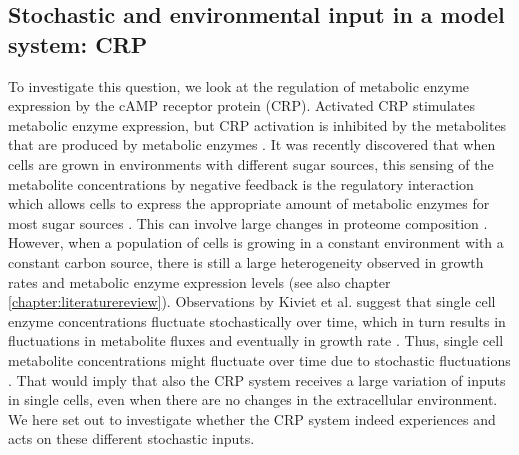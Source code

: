 
\subsection{Stochastic and environmental input in a model system: CRP}

To investigate this question, we look at the regulation of metabolic enzyme expression by the cAMP receptor protein (CRP).
%
Activated CRP stimulates metabolic enzyme expression, but CRP activation is inhibited by the metabolites that are produced by metabolic enzymes \cite{You2013}.
%
It was recently discovered that when cells are grown in environments with different sugar sources, 
this sensing of the metabolite concentrations by negative feedback 
is the regulatory interaction which %
allows cells to 
express the appropriate amount of metabolic enzymes for most sugar sources \cite{Towbin2017}.
%
This can involve large changes in proteome composition \cite{You2013, Hui2015}.
%
However, when a population of cells is growing in a constant environment with a constant carbon source,
there is still a large heterogeneity observed in growth rates and metabolic enzyme expression levels \cite{Kiviet2014} (see also chapter \ref{chapter:literaturereview}).
%
Observations by Kiviet et al. suggest that single cell enzyme concentrations fluctuate stochastically over time, which in turn results in fluctuations in metabolite fluxes and eventually in growth rate \cite{Kiviet2014}.
%
Thus, single cell metabolite concentrations might fluctuate over time due to stochastic fluctuations .
That would imply that also the CRP system receives a large variation of inputs in single cells, even when there are no changes in the extracellular environment.
%
%
We here set out to investigate whether the CRP system indeed experiences and acts on these different stochastic inputs.

